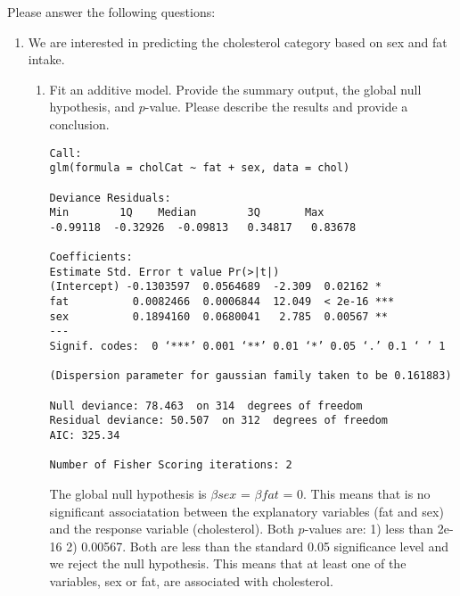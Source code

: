 \documentclass[12pt,letterpaper]{article}
\begin{document}
\newpage
\noindent Please answer the following questions:

\begin{enumerate}
	\item
	We are interested in predicting the cholesterol category based on sex and fat intake.
	\begin{enumerate}
		\item
		Fit an additive model. Provide the summary output, the global null hypothesis, and $p$-value. Please describe the results and provide a conclusion.
		
\begin{Verbatim}
Call:
glm(formula = cholCat ~ fat + sex, data = chol)

Deviance Residuals: 
Min        1Q    Median        3Q       Max  
-0.99118  -0.32926  -0.09813   0.34817   0.83678  

Coefficients:
Estimate Std. Error t value Pr(>|t|)    
(Intercept) -0.1303597  0.0564689  -2.309  0.02162 *  
fat          0.0082466  0.0006844  12.049  < 2e-16 ***
sex          0.1894160  0.0680041   2.785  0.00567 ** 
---
Signif. codes:  0 ‘***’ 0.001 ‘**’ 0.01 ‘*’ 0.05 ‘.’ 0.1 ‘ ’ 1

(Dispersion parameter for gaussian family taken to be 0.161883)

Null deviance: 78.463  on 314  degrees of freedom
Residual deviance: 50.507  on 312  degrees of freedom
AIC: 325.34

Number of Fisher Scoring iterations: 2
\end{Verbatim}
		The global null hypothesis is $\beta sex$ = $\beta fat$ = 0. This means that is no significant associatation between the explanatory variables (fat and sex) and the response variable (cholesterol). Both $p$-values are: 1) less than 2e-16 2) 0.00567. Both are less than the standard 0.05 significance level and we reject the null hypothesis. This means that at least one of the variables, sex or fat, are associated with cholesterol.
	\end{enumerate}
	

\end{enumerate}
\end{document}
